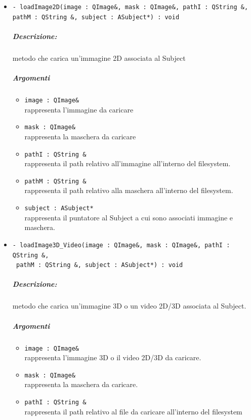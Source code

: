 		\begin{itemize}
			\item \color{blue} \verb!- loadImage2D(image : QImage&, mask : QImage&, pathI : QString &, pathM : QString &, subject : ASubject*) : void!
			\color{black}
			\subparagraph{Descrizione:} metodo che carica un'immagine 2D associata al Subject\g{}
			\color{black}
			\subparagraph{Argomenti}
			\begin{itemize}
				\item \color{RoyalPurple} \verb!image : QImage&!\\				
\color{black} rappresenta l'immagine da caricare
				\item \color{RoyalPurple} \verb!mask : QImage&!\\				
\color{black} rappresenta la maschera da caricare
				\item \color{RoyalPurple} \verb!pathI : QString &!\\				
\color{black} rappresenta il path relativo all'immagine all'interno del filesystem.
				\item \color{RoyalPurple} \verb!pathM : QString &!\\				
\color{black} rappresenta il path relativo alla maschera all'interno del filesystem.
				\item \color{RoyalPurple} \verb!subject : ASubject*!\\				
\color{black} rappresenta il puntatore al Subject\g{} a cui sono associati immagine e maschera.
			\end{itemize}
			\item \color{blue} \verb!- loadImage3D_Video(image : QImage&, mask : QImage&, pathI : QString &,! \\ \verb! pathM : QString &, subject : ASubject*) : void!
			\color{black}
			\subparagraph{Descrizione:} metodo che carica un'immagine 3D o un video 2D/3D associata al Subject{}.
			\color{black}
			\subparagraph{Argomenti}
			\begin{itemize}
				\item \color{RoyalPurple} \verb!image : QImage&!\\				
\color{black} rappresenta l'immagine 3D o il video 2D/3D  da caricare.
				\item \color{RoyalPurple} \verb!mask : QImage&!\\				
\color{black} rappresenta la maschera da caricare.
				\item \color{RoyalPurple} \verb!pathI : QString &!\\				
\color{black} rappresenta il path relativo al file da caricare all'interno del filesystem

\end{itemize}
\end{itemize}
